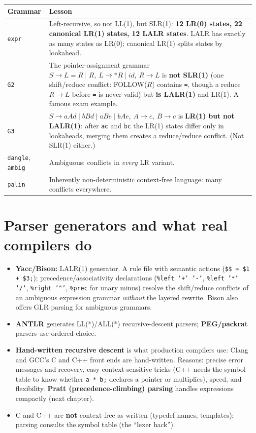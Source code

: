 \documentclass[10pt,a4paper,openany,oneside]{report}
\newcommand{\prio}[1]{\texorpdfstring{\ifcase#1\or{\color{gold}\ding{72}}\or{\color{gold}\ding{72}\ding{72}}\or{\color{gold}\ding{72}\ding{72}\ding{72}}\fi}{}}
\begin{document}
\begin{center}\small
\begin{xltabular}{\textwidth}{@{}L{2.0cm}Y@{}}
\toprule
\textbf{Grammar} & \textbf{Lesson}\\
\midrule\endhead
\texttt{expr} & Left-recursive, so not LL(1), but SLR(1): \textbf{12 LR(0) states, 22 canonical LR(1) states, 12 LALR states}. LALR has exactly as many states as LR(0); canonical LR(1) splits states by lookahead.\\
\texttt{G2} & The pointer-assignment grammar $S\to L=R\mid R,\ L\to *R\mid \textit{id},\ R\to L$ is \textbf{not SLR(1)} (one shift/reduce conflict: FOLLOW($R$) contains \texttt{=}, though a reduce $R\to L$ before \texttt{=} is never valid) but \textbf{is LALR(1)} and LR(1). A famous exam example.\\
\texttt{G3} & $S\to aAd\mid bBd\mid aBe\mid bAe,\ A\to c,\ B\to c$ is \textbf{LR(1) but not LALR(1)}: after \texttt{ac} and \texttt{bc} the LR(1) states differ only in lookaheads, merging them creates a reduce/reduce conflict. (Not SLR(1) either.)\\
\texttt{dangle}, \texttt{ambig} & Ambiguous: conflicts in \emph{every} LR variant.\\
\texttt{palin} & Inherently non-deterministic context-free language: many conflicts everywhere.\\
\bottomrule
\end{xltabular}
\end{center}

\section{Parser generators and what real compilers do \prio{2}}
\begin{itemize}[nosep]
\item \textbf{Yacc/Bison:} LALR(1) generator. A rule file with semantic actions (\texttt{\$\$ = \$1 + \$3;}); precedence/associativity declarations (\texttt{\%left '+' '-'}, \texttt{\%left '*' '/'}, \texttt{\%right '\textasciicircum{}'}, \texttt{\%prec} for unary minus) resolve the shift/reduce conflicts of an ambiguous expression grammar \emph{without} the layered rewrite. Bison also offers GLR parsing for ambiguous grammars.
\item \textbf{ANTLR} generates LL(*)/ALL(*) recursive-descent parsers; \textbf{PEG/packrat} parsers use ordered choice.
\item \textbf{Hand-written recursive descent} is what production compilers use: Clang and GCC's C and C++ front ends are hand-written. Reasons: precise error messages and recovery, easy context-sensitive tricks (C++ needs the symbol table to know whether \texttt{a * b;} declares a pointer or multiplies), speed, and flexibility. \textbf{Pratt (precedence-climbing) parsing} handles expressions compactly (next chapter).
\item C and C++ are \textbf{not} context-free as written (typedef names, templates): parsing consults the symbol table (the ``lexer hack'').
\end{itemize}
\end{document}
